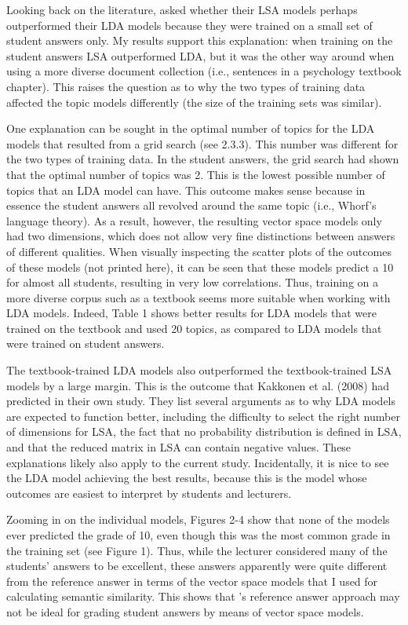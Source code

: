 \documentclass[a4paper,10pt,twoside]{article}
\begin{document}
Looking back on the literature,  asked whether their LSA models perhaps outperformed their LDA models because they were trained on a small set of student answers only. My results support this explanation: when training on the student answers LSA outperformed LDA, but it was the other way around when using a more diverse document collection (i.e., sentences in a psychology textbook chapter). This raises the question as to why the two types of training data affected the topic models differently (the size of the training sets was similar).

One explanation can be sought in the optimal number of topics for the LDA models that resulted from a grid search (see 2.3.3). This number was different for the two types of training data. In the student answers, the grid search had shown that the optimal number of topics was 2. This is the lowest possible number of topics that an LDA model can have. This outcome makes sense because in essence the student answers all revolved around the same topic (i.e., Whorf's language theory). As a result, however, the resulting vector space models only had two dimensions, which does not allow very fine distinctions between answers of different qualities. When visually inspecting the scatter plots of the outcomes of these models (not printed here), it can be seen that these models predict a 10 for almost all students, resulting in very low correlations. Thus, training on a more diverse corpus such as a textbook seems more suitable when working with LDA models. Indeed, Table 1 shows better results for LDA models that were trained on the textbook and used 20 topics, as compared to LDA models that were trained on student answers.

The textbook-trained LDA models also outperformed the textbook-trained LSA models by a large margin. This is the outcome that Kakkonen et al. (2008) had predicted in their own study. They list several arguments as to why LDA models are expected to function better, including the difficulty to select the right number of dimensions for LSA, the fact that no probability distribution is defined in LSA, and that the reduced matrix in LSA can contain negative values. These explanations likely also apply to the current study. Incidentally, it is nice to see the LDA model achieving the best results, because this is the model whose outcomes are easiest to interpret by students and lecturers.

Zooming in on the individual models, Figures 2-4 show that none of the models ever predicted the grade of 10, even though this was the most common grade in the training set (see Figure 1). Thus, while the lecturer considered many of the students’ answers to be excellent, these answers apparently were quite different from the reference answer in terms of the vector space models that I used for calculating semantic similarity. This shows that \cite{wolfe1998}'s reference answer approach may not be ideal for grading student answers by means of vector space models.
\end{document}
